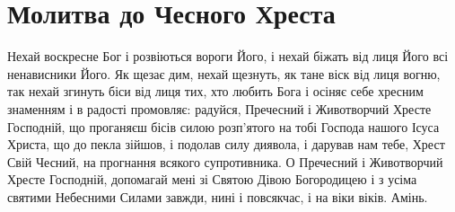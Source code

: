 \documentclass[chapters.tex]{subfiles}
\begin{document}
\section{Молитва до Чесного Хреста}
Нехай воскресне Бог і розвіються вороги Його, і нехай біжать від лиця Його всі ненависники Його. Як щезає дим, нехай щезнуть, як тане віск від лиця вогню, так нехай згинуть біси від лиця тих, хто любить Бога і осіняє себе хресним знаменням і в радості промовляє: радуйся, Пречесний і Животворчий Хресте Господній, що проганяєш бісів силою розп’ятого на тобі Господа нашого Ісуса Христа, що до пекла зійшов, і подолав силу диявола, і дарував нам тебе, Хрест Свій Чесний, на прогнання всякого супротивника. О Пречесний і Животворчий Хресте Господній, допомагай мені зі Святою Дівою Богородицею і з усіма святими Небесними Силами завжди, нині і повсякчас, і на віки віків. Амінь.
\end{document}

